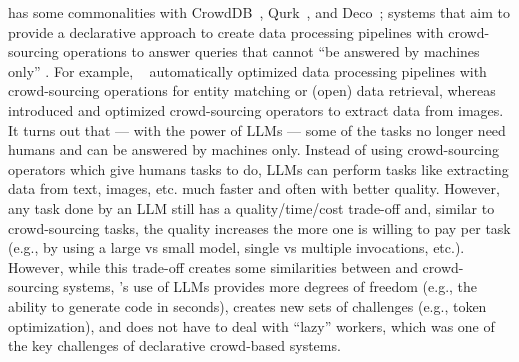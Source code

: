 \system{} has some commonalities with  CrowdDB~\cite{crowddb}, Qurk~\cite{qurk}, and Deco~\cite{deco};  systems that aim to provide a declarative approach to create data processing pipelines with crowd-sourcing operations to answer queries that cannot ``be answered by machines only'' \cite{crowddb}. 
For example, ~\cite{crowddb} automatically optimized data processing pipelines with  crowd-sourcing operations for entity matching or (open) data retrieval, whereas ~\cite{crowdcount} introduced and optimized crowd-sourcing operators to extract data from images. 
It turns out that --- with the power of LLMs --- some of the tasks no longer need humans and can be answered by machines only.
Instead of using crowd-sourcing operators which give humans tasks to do, LLMs can perform tasks like extracting data from text, images, etc. much faster and often with better quality. 
However, any task done by an LLM still has a quality/time/cost trade-off and, similar to crowd-sourcing tasks, the quality increases the more one is willing to pay per task (e.g., by using a large vs small model, single vs multiple invocations, etc.). 
However, while this trade-off creates some similarities between \system{} and crowd-sourcing systems, \system{}'s use of LLMs provides more degrees of freedom (e.g., the ability to generate code in seconds), creates new sets of challenges (e.g., token optimization), and does not have to deal with ``lazy'' workers, which was one of the key challenges of declarative crowd-based systems. 


